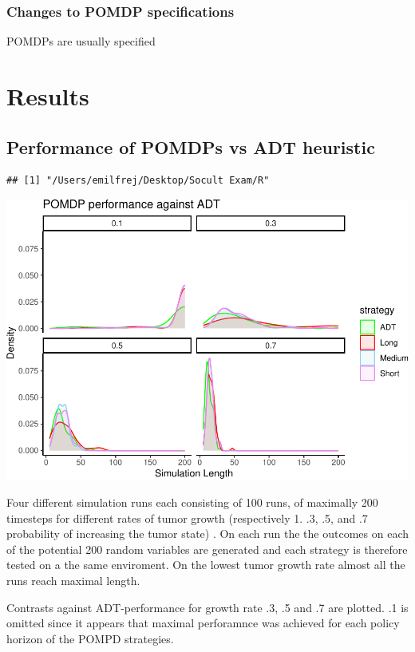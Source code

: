 \documentclass[notspecified,article,submit,moreauthors,pdftex]{Definitions/mdpi}
\begin{document}
\subsubsection{Changes to POMDP
specifications}\label{changes-to-pomdp-specifications}

POMDPs are usually specified

\section{Results}\label{results}

\subsection{Performance of POMDPs vs ADT
heuristic}\label{performance-of-pomdps-vs-adt-heuristic}

\begin{verbatim}
## [1] "/Users/emilfrej/Desktop/Socult Exam/R"
\end{verbatim}

\includegraphics{SocultPaper_files/figure-latex/unnamed-chunk-1-1.pdf}

Four different simulation runs each consisting of 100 runs, of maximally
200 timesteps for different rates of tumor growth (respectively 1. .3,
.5, and .7 probability of increasing the tumor state) . On each run the
the outcomes on each of the potential 200 random variables are generated
and each strategy is therefore tested on a the same enviroment. On the
lowest tumor growth rate almost all the runs reach maximal length.

Contrasts against ADT-performance for growth rate .3, .5 and .7 are
plotted. .1 is omitted since it appears that maximal perforamnce was
achieved for each policy horizon of the POMPD strategies.
\end{document}
